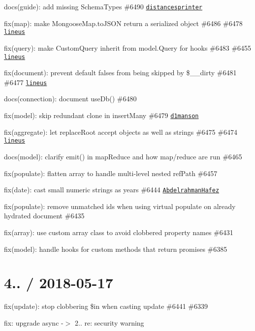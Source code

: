 \begin{DoxyItemize}
\item docs(guide)\+: add missing Schema\+Types \#6490 \href{https://github.com/distancesprinter}{\tt distancesprinter}
\item fix(map)\+: make Mongoose\+Map.\+to\+J\+S\+ON return a serialized object \#6486 \#6478 \href{https://github.com/lineus}{\tt lineus}
\item fix(query)\+: make Custom\+Query inherit from model.\+Query for hooks \#6483 \#6455 \href{https://github.com/lineus}{\tt lineus}
\item fix(document)\+: prevent default falses from being skipped by \$\+\_\+\+\_\+dirty \#6481 \#6477 \href{https://github.com/lineus}{\tt lineus}
\item docs(connection)\+: document {\ttfamily use\+Db()} \#6480
\item fix(model)\+: skip redundant clone in insert\+Many \#6479 \href{https://github.com/d1manson}{\tt d1manson}
\item fix(aggregate)\+: let replace\+Root accept objects as well as strings \#6475 \#6474 \href{https://github.com/lineus}{\tt lineus}
\item docs(model)\+: clarify {\ttfamily emit()} in map\+Reduce and how map/reduce are run \#6465
\item fix(populate)\+: flatten array to handle multi-\/level nested {\ttfamily ref\+Path} \#6457
\item fix(date)\+: cast small numeric strings as years \#6444 \href{https://github.com/AbdelrahmanHafez}{\tt Abdelrahman\+Hafez}
\item fix(populate)\+: remove unmatched ids when using virtual populate on already hydrated document \#6435
\item fix(array)\+: use custom array class to avoid clobbered property names \#6431
\item fix(model)\+: handle hooks for custom methods that return promises \#6385
\end{DoxyItemize}

\section*{4.. / 2018-\/05-\/17 }


\begin{DoxyItemize}
\item fix(update)\+: stop clobbering \$in when casting update \#6441 \#6339
\item fix\+: upgrade async -\/$>$ 2.. re\+: security warning
\end{DoxyItemize}

